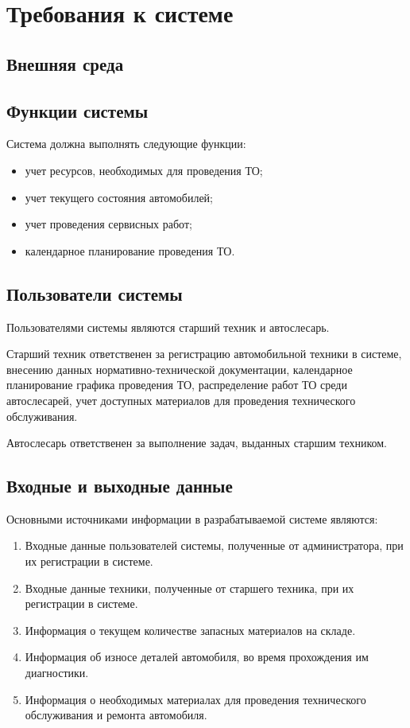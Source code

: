 \section{Требования к системе}
\subsection{Внешняя среда}

\subsection{Функции системы}
Система должна выполнять следующие функции:
\begin{itemize}
  \item учет ресурсов, необходимых для проведения ТО;
  \item учет текущего состояния автомобилей;
  \item учет проведения сервисных работ;
  \item календарное планирование проведения ТО.
\end{itemize}

\subsection{Пользователи системы}
Пользователями системы являются старший техник и автослесарь.

Старший техник ответственен за регистрацию автомобильной техники в системе,
внесению данных нормативно-технической документации, календарное планирование
графика проведения ТО, распределение работ ТО среди автослесарей, учет доступных
материалов для проведения технического обслуживания.

Автослесарь ответственен за выполнение задач, выданных старшим техником.

\subsection{Входные и выходные данные}
Основными источниками информации в разрабатываемой системе являются:
\begin{enumerate}
  \item Входные данные пользователей системы, полученные от администратора,
    при их регистрации в системе.
    \item Входные данные техники, полученные от старшего техника, при их
    регистрации в системе.
  \item Информация о текущем количестве запасных материалов на складе.
  \item Информация об износе деталей автомобиля, во время прохождения им
        диагностики.
  \item Информация о необходимых материалах для проведения технического
        обслуживания и ремонта автомобиля.
\end{enumerate}

